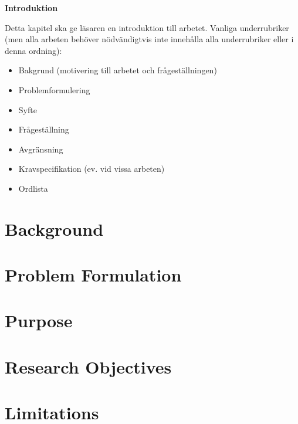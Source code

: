 \begin{mdframed}[innertopmargin=10pt, innerbottommargin=10pt, innerleftmargin=10pt, innerrightmargin=10pt, skipabove=10pt, skipbelow=10pt, roundcorner=10pt]
    \textbf{Introduktion}
    
    Detta kapitel ska ge läsaren en introduktion till arbetet. Vanliga underrubriker (men alla arbeten behöver nödvändigtvis inte innehålla alla underrubriker eller i denna ordning):
    
    \begin{itemize}
        \item Bakgrund (motivering till arbetet och frågeställningen)
        \item Problemformulering
        \item Syfte
        \item Frågeställning 
        \item Avgränsning
        \item Kravspecifikation (ev. vid vissa arbeten)
        \item Ordlista
    \end{itemize}
    \end{mdframed}

\section{Background}
\label{sec:background}


\section{Problem Formulation}
\label{sec:problemformulation}


\section{Purpose}
\label{sec:purpose}
%

\section{Research Objectives}
\label{sec:researchobjectives}


\section{Limitations}
\label{sec:limitations}


